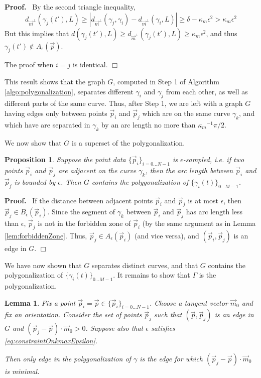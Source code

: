 \documentclass{article}
\newcommand{\nin}{\not\in}
\newtheorem{proposition}[cntr]{Proposition}
\newenvironment{proof}{
  \noindent\textbf{Proof.}\ }{\hspace*{\fill}
  \begin{math}\Box\end{math}\medskip}
\newtheorem{lemma}[cntr]{Lemma}
\numberwithin{cntr}{section}
\numberwithin{equation}{section}
\newcommand{\abs}[1]{\left| #1 \right|}%
\newcommand{\vp}[0]{{\vec{p}}}
\newcommand{\vm}[0]{{\vec{m}}}
\newcommand{\Oto}[1]{{0 \ldots #1-1}}
\newcommand{\OtoN}{{0 \ldots N-1}}
\newcommand{\pointData}{{ \{ \vp_{i} \}_{i=\OtoN} }}
\newcommand{\curveSet}{{ \{ \gamma_i(t) \}_{\Oto{M}}}}
\newcommand{\ball}[2]{ { B_{#1}(#2) } }
\newcommand{\allowed}[2]{ { A_{#1}(#2) } }
\newcommand{\kmax}{{\kappa_{m}}}
\newcommand{\kmaxi}{{\kmax^{-1}}}
\begin{document}
\begin{proof}
By the second triangle inequality,
\begin{equation*}
  d_{\vm^{\perp}}(\gamma_{j}(t'), L) \geq \abs{d_{\vm^{\perp}}(\gamma_{j}, \gamma_{i}) -  d_{\vm^{\perp}}(\gamma_{i}, L)}
  \geq \delta - \kmax \epsilon^{2} > \kmax \epsilon^{2}
\end{equation*}
But this implies that $d(\gamma_{j}(t'), L) \geq d_{\vm^{\perp}}(\gamma_{j}(t'), L) \geq \kmax \epsilon^{2}$, and thus $\gamma_{j}(t') \nin \allowed{\epsilon}{\vp}$.

The proof when $i=j$ is identical.
\end{proof}

This result shows that the graph $G$, computed in Step 1 of Algorithm \ref{algo:polygonalization}, separates different $\gamma_{i}$ and $\gamma_{j}$ from each other, as well as different parts of the same curve. Thus, after Step 1, we are left with a graph $G$ having edges only between points $\vp_{i}$ and $\vp_{j}$ which are on the same curve $\gamma_{k}$, and which have are separated in $\gamma_{k}$ by an arc length no more than $\kmaxi \pi/2$.

We now show that $G$ is a superset of the polygonalization.

\begin{proposition}
  Suppose the point data $\pointData$ is $\epsilon$-sampled, i.e. if two points $\vp_{i}$ and $\vp_{j}$ are adjacent on the curve $\gamma_{k}$, then the \emph{arc length} between $\vp_{i}$ and $\vp_{j}$ is bounded by $\epsilon$. Then $G$ contains the polygonalization of $\curveSet$.
\end{proposition}
\begin{proof}
  If the distance between adjacent points $\vp_{i}$ and $\vp_{j}$ is at most $\epsilon$, then $\vp_{j} \in \ball{\epsilon}{\vp_{i}}$. Since the segment of $\gamma_{k}$ between $\vp_{i}$ and $\vp_{j}$ has arc length less than $\epsilon$, $\vp_{j}$ is not in the forbidden zone of $\vp_{i}$ (by the same argument as in Lemma \ref{lem:forbiddenZone}. Thus, $\vp_{j} \in \allowed{\epsilon}{\vp_{i}}$ (and vice versa), and $(\vp_{i},\vp_{j})$ is an edge in $G$.
\end{proof}

We have now shown that $G$ separates distinct curves, and that $G$ contains the polygonalization of $\curveSet$. It remains to show that $\Gamma$ is the polygonalization.

\begin{lemma}
  \label{eq:closestTangentPointInAllowedRegionIsCorrect}
  Fix a point $\vp_{i}=\vp \in \pointData$. Choose a tangent vector $\vm_{0}$ and fix an orientation. Consider the set of points $\vp_{j}$ such that $(\vp, \vp_{j})$ is an edge in $G$ and $(\vp_{j} - \vp) \cdot \vm_{0} > 0$. Suppose also that $\epsilon$ satisfies \eqref{eq:constraintOnkmaxEpsilon}.

  Then only edge in the polygonalization of $\gamma$ is the edge for which $(\vp_{j} - \vp) \cdot \vm_{0}$ is minimal.
\end{lemma}
\end{document}
